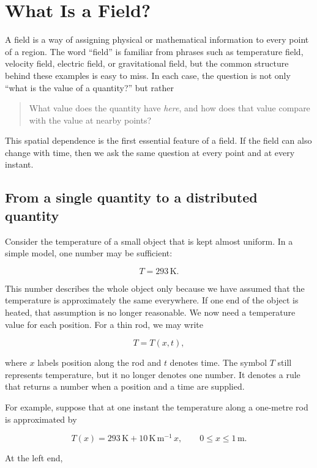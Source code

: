 \section{What Is a Field?}
\label{sec:what_is_a_field}

A field is a way of assigning physical or mathematical information to every point of a region. The word ``field'' is familiar from phrases such as temperature field, velocity field, electric field, or gravitational field, but the common structure behind these examples is easy to miss. In each case, the question is not only ``what is the value of a quantity?'' but rather

\begin{quote}
What value does the quantity have \emph{here}, and how does that value compare with the value at nearby points?
\end{quote}

This spatial dependence is the first essential feature of a field. If the field can also change with time, then we ask the same question at every point and at every instant.

\subsection{From a single quantity to a distributed quantity}

Consider the temperature of a small object that is kept almost uniform. In a simple model, one number may be sufficient:

\[
T = 293\,\mathrm{K}.
\]

This number describes the whole object only because we have assumed that the temperature is approximately the same everywhere. If one end of the object is heated, that assumption is no longer reasonable. We now need a temperature value for each position. For a thin rod, we may write

\[
T = T(x,t),
\]

where \(x\) labels position along the rod and \(t\) denotes time. The symbol \(T\) still represents temperature, but it no longer denotes one number. It denotes a rule that returns a number when a position and a time are supplied.

For example, suppose that at one instant the temperature along a one-metre rod is approximated by

\[
T(x)=293\,\mathrm{K}+10\,\mathrm{K\,m^{-1}}\,x,
\qquad 0\leq x\leq 1\,\mathrm{m}.
\]

At the left end,

